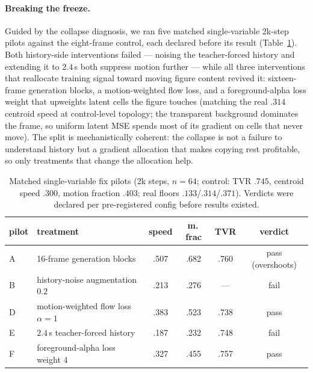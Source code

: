 \documentclass[10pt,twocolumn]{article}
\begin{document}
\paragraph{Breaking the freeze.} Guided by the collapse diagnosis, we ran five matched single-variable 2k-step pilots
against the eight-frame control, each declared before its result (Table~\ref{tab:pilots}). Both history-side
interventions failed — noising the teacher-forced history and extending it to $2.4$\,s both suppress motion further —
while all three interventions that reallocate training signal toward moving figure content revived it:
sixteen-frame generation blocks, a motion-weighted flow loss, and a foreground-alpha loss weight
that upweights latent cells the figure touches (matching the real $.314$ centroid speed at control-level topology; the
transparent background dominates the frame, so uniform latent MSE spends most of its gradient on cells that never
move). The split is mechanistically coherent: the collapse is not a failure to understand history but a gradient
allocation that makes copying rest profitable, so only treatments that change the allocation help.

\begin{table}[t]\centering\caption{Matched single-variable fix pilots (2k steps, $n{=}64$; control: TVR $.745$,
centroid speed $.300$, motion fraction $.403$; real floors $.133$/$.314$/$.371$). Verdicts were declared per
pre-registered config before results existed.}\label{tab:pilots}\scriptsize
\begin{tabular}{llccc c}
\toprule
pilot & treatment & speed & m.\,frac & TVR & verdict \\
\midrule
A & 16-frame generation blocks & .507 & .682 & .760 & pass (overshoots) \\
B & history-noise augmentation $0.2$ & .213 & .276 & — & fail \\
D & motion-weighted flow loss $\alpha{=}1$ & .383 & .523 & .738 & pass \\
E & $2.4$\,s teacher-forced history & .187 & .232 & .748 & fail \\
F & foreground-alpha loss weight $4$ & .327 & .455 & .757 & pass \\
\bottomrule
\end{tabular}
\end{table}
\end{document}
